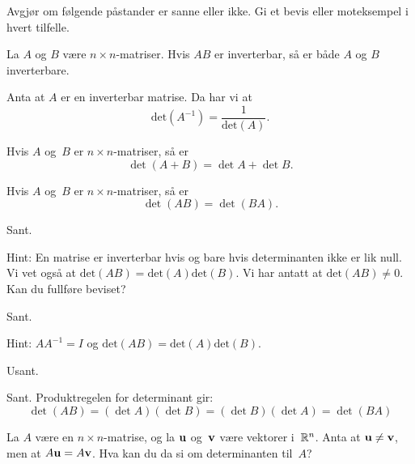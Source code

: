 \begin{oppgave}
Avgjør om følgende påstander er sanne eller ikke. Gi et bevis eller moteksempel i hvert tilfelle.

\begin{punkt}
La $A$ og $B$ være $n\times n$-matriser. Hvis $AB$ er inverterbar, så er både $A$ og $B$ inverterbare.
\end{punkt}

\begin{punkt}
Anta at $A$ er en inverterbar matrise. Da har vi at $$\text{det}(A^{-1})=\frac{1}{\text{det}(A)}.$$
\end{punkt}

\begin{punkt}
Hvis $A$ og~$B$ er $n \times n$-matriser, så er
\[
\det (A + B) = \det A + \det B.
\]
\end{punkt}

\begin{punkt}
Hvis $A$ og~$B$ er $n \times n$-matriser, så er
\[
\det (AB) = \det (BA).
\]
\end{punkt}

\end{oppgave}

\begin{losning}

\begin{punkt}
Sant.

\noindent
Hint: En matrise er inverterbar hvis og bare hvis determinanten ikke er lik null. Vi vet også at $\text{det}(AB)=\text{det}(A)\text{det}(B)$. Vi har antatt at $\text{det}(AB)\neq 0$. Kan du fullføre beviset?
\end{punkt}

\begin{punkt}
Sant.

\noindent
Hint: $AA^{-1}=I$ og $\text{det}(AB)=\text{det}(A)\text{det}(B)$.
\end{punkt}

\begin{punkt}
Usant.
\end{punkt}

\begin{punkt}
Sant.  Produktregelen for determinant gir:
\[
\det (AB)
 = (\det A)(\det B)
 = (\det B)(\det A)
 = \det (BA)
\]
\end{punkt}

\end{losning}


\begin{oppgave}
La $A$ være en $n \times n$-matrise, og la $\mathbf{u}$ og~$\mathbf{v}$ være
vektorer i~$\mathbb{R}^n$.  Anta at $\mathbf{u} \ne \mathbf{v}$, men at
$A \mathbf{u} = A \mathbf{v}$.  Hva kan du da si om determinanten til~$A$?
\end{oppgave}

